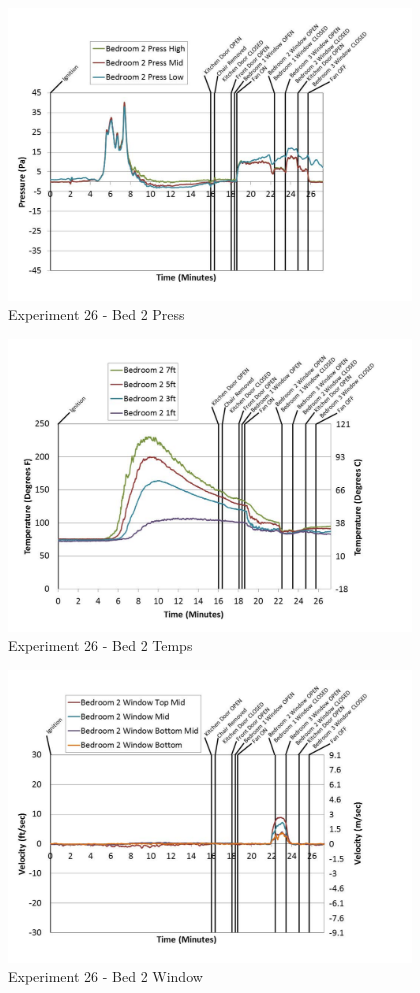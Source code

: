 \documentclass{article}
\begin{document}
\begin{appendices}
	\clearpage

	\begin{figure}[h!]
		\centering
		\includegraphics[height=3.05in]{0_Images/Results_Charts/Exp_26_Charts/Bed2Press.pdf}
		\caption{Experiment 26 - Bed 2 Press}
	\end{figure}
 

	\begin{figure}[h!]
		\centering
		\includegraphics[height=3.05in]{0_Images/Results_Charts/Exp_26_Charts/Bed2Temps.pdf}
		\caption{Experiment 26 - Bed 2 Temps}
	\end{figure}
 
	\clearpage

	\begin{figure}[h!]
		\centering
		\includegraphics[height=3.05in]{0_Images/Results_Charts/Exp_26_Charts/Bed2Window.pdf}
		\caption{Experiment 26 - Bed 2 Window}
	\end{figure}
 


\end{appendices}
\end{document}
